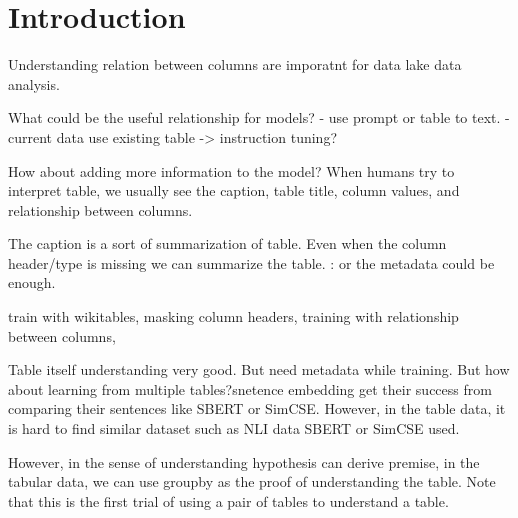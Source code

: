 \section{Introduction}
Understanding relation between columns are imporatnt for data lake data analysis.

What could be the useful relationship for models?
- use prompt or table to text.
- current data use existing table -> instruction tuning?

How about adding more information to the model? When humans try to interpret
table, we usually see the caption, table title, column values, and relationship
between columns.

The caption is a sort of summarization of table. Even when the column header/type is missing
we can summarize the table.
: or the metadata could be enough.

train with wikitables, masking column headers, training with relationship
between columns, 

Table itself understanding very good. But need metadata while training. But how
about learning from multiple tables?snetence embedding get their success from
comparing their sentences like SBERT or SimCSE. However, in the table data, it
is hard to find similar dataset such as NLI data SBERT or SimCSE used. 

However, in the sense of understanding hypothesis can derive premise, in the
tabular data, we can use groupby as the proof of understanding the table. Note
that this is the first trial of using a pair of tables to understand a table.
